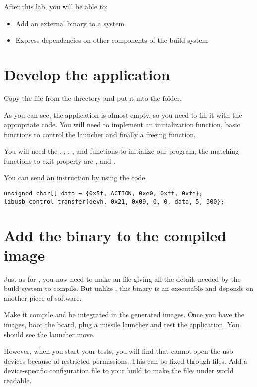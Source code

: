 
After this lab, you will be able to:
\begin{itemize}
  \item Add an external binary to a system
  \item Express dependencies on other components of the build system
\end{itemize}

\section{Develop the application}

Copy the  file from the
 directory and put it
into the  folder.

As you can see, the application is almost empty, so you need to fill
it with the appropriate code. You will need to implement an
initialization function, basic functions to control the launcher and
finally a freeing function.

You will need the , ,
, ,
 and 
functions to initialize our program, the matching functions to exit
properly are , 
and .

You can send an instruction by using the code
\begin{lstlisting}
unsigned char[] data = {0x5f, ACTION, 0xe0, 0xff, 0xfe};
libusb_control_transfer(devh, 0x21, 0x09, 0, 0, data, 5, 300};
\end{lstlisting}

\section{Add the binary to the compiled image}

Just as for , you now need to make an  file
giving all the details needed by the build system to compile. But
unlike , this binary is an executable and depends on another
piece of software.

Make it compile and be integrated in the generated images. Once you
have the images, boot the board, plug a missile launcher and test the
application. You should see the launcher move.

However, when you start your tests, you will find that  cannot open
the usb devices because of restricted permissions. This can be fixed
through  files. Add a device-specific 
configuration file to your build to make the files under
 world readable.
